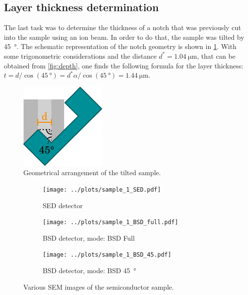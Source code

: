 \subsection{Layer thickness determination}
The last task was to determine the thickness of a notch that was
previously cut into the sample using an ion beam.
In order to do that, the sample was tilted by \qty{45}{\degree}.
The schematic representation of the notch geometry is shown
in \cref{fig:layer}.
With some trigonometric considerations and the distance
$d^*=\qty{1.04}{\micro\meter}$, that can be obtained from
\cref{fig:depth},
one finds the following formula for the layer thickness:
$t = d / \cos(\qty{45}{\degree}) = d^* \alpha / \cos(\qty{45}{\degree})
	= \qty{1.44}{\micro\meter}$.
\vfill

\begin{figure}[!h]
	\centering
	\includegraphics{../assets/angle.pdf}
	\caption{Geometrical arrangement of the tilted sample.}
	\label{fig:layer}
\end{figure}

\begin{figure}[t!]
	\centering
	\begin{subfigure}{0.7\linewidth}
		\centering
		\texttt{[image: ../plots/sample\_1\_SED.pdf]}
		\caption{SED detector}
		\label{subfig:sample_0_sed}
	\end{subfigure}
	\begin{subfigure}{0.7\linewidth}
		\centering
		\texttt{[image: ../plots/sample\_1\_BSD\_full.pdf]}
		\caption{BSD detector,  mode: BSD Full}
		\label{subfig:sample_0_bsd_full}
	\end{subfigure}
	\begin{subfigure}{0.7\linewidth}
		\centering
		\texttt{[image: ../plots/sample\_1\_BSD\_45.pdf]}
		\caption{BSD detector, mode: BSD \qty{45}{\degree}}
		\label{subfig:sample_0_bsd_45}
	\end{subfigure}
	\caption{Various SEM images of the semiconductor sample.}
	\label{fig:sample_0}
\end{figure}

